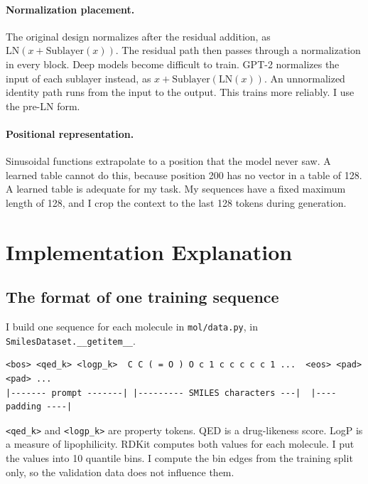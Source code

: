 \documentclass[11pt,a4paper]{article}
\newcommand{\code}[1]{\texttt{#1}}
\begin{document}
\paragraph{Normalization placement.} The original design normalizes after the residual addition,
as $\mathrm{LN}(x + \mathrm{Sublayer}(x))$. The residual path then passes through a normalization
in every block. Deep models become difficult to train. GPT-2 normalizes the input of each sublayer
instead, as $x + \mathrm{Sublayer}(\mathrm{LN}(x))$. An unnormalized identity path runs from the
input to the output. This trains more reliably. I use the pre-LN form.

\paragraph{Positional representation.} Sinusoidal functions extrapolate to a position that the
model never saw. A learned table cannot do this, because position 200 has no vector in a table of
128. A learned table is adequate for my task. My sequences have a fixed maximum length of 128, and
I crop the context to the last 128 tokens during generation.

\section{Implementation Explanation}

\subsection{The format of one training sequence}

I build one sequence for each molecule in \code{mol/data.py}, in
\code{SmilesDataset.\_\_getitem\_\_}.

\begin{Verbatim}[fontsize=\small,frame=single,framesep=3mm,rulecolor=\color{rule}]
<bos> <qed_k> <logp_k>  C C ( = O ) O c 1 c c c c c 1 ...  <eos> <pad> <pad> ...
|------- prompt -------| |--------- SMILES characters ---|  |---- padding ----|
\end{Verbatim}

\code{<qed\_k>} and \code{<logp\_k>} are property tokens. QED is a drug-likeness score. LogP is a
measure of lipophilicity. RDKit computes both values for each molecule. I put the values into 10
quantile bins. I compute the bin edges from the training split only, so the validation data does
not influence them.
\end{document}
